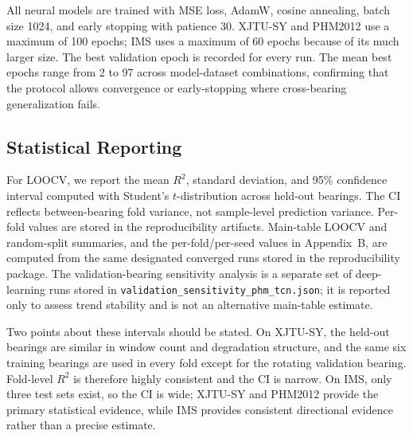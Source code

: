 \documentclass[pdflatex,sn-mathphys-num]{sn-jnl}
\begin{document}
All neural models are trained with MSE loss, AdamW, cosine annealing, batch size 1024, and early stopping with patience 30. XJTU-SY and PHM2012 use a maximum of 100 epochs; IMS uses a maximum of 60 epochs because of its much larger size. The best validation epoch is recorded for every run. The mean best epochs range from 2 to 97 across model-dataset combinations, confirming that the protocol allows convergence or early-stopping where cross-bearing generalization fails.

\subsection{Statistical Reporting}
For LOOCV, we report the mean $R^2$, standard deviation, and 95\% confidence interval computed with Student's $t$-distribution across held-out bearings. The CI reflects between-bearing fold variance, not sample-level prediction variance. Per-fold values are stored in the reproducibility artifacts. Main-table LOOCV and random-split summaries, and the per-fold/per-seed values in Appendix~B, are computed from the same designated converged runs stored in the reproducibility package. The validation-bearing sensitivity analysis is a separate set of deep-learning runs stored in \texttt{validation\_sensitivity\_phm\_tcn.json}; it is reported only to assess trend stability and is not an alternative main-table estimate.

Two points about these intervals should be stated. On XJTU-SY, the held-out bearings are similar in window count and degradation structure, and the same six training bearings are used in every fold except for the rotating validation bearing. Fold-level $R^2$ is therefore highly consistent and the CI is narrow. On IMS, only three test sets exist, so the CI is wide; XJTU-SY and PHM2012 provide the primary statistical evidence, while IMS provides consistent directional evidence rather than a precise estimate.
\end{document}
